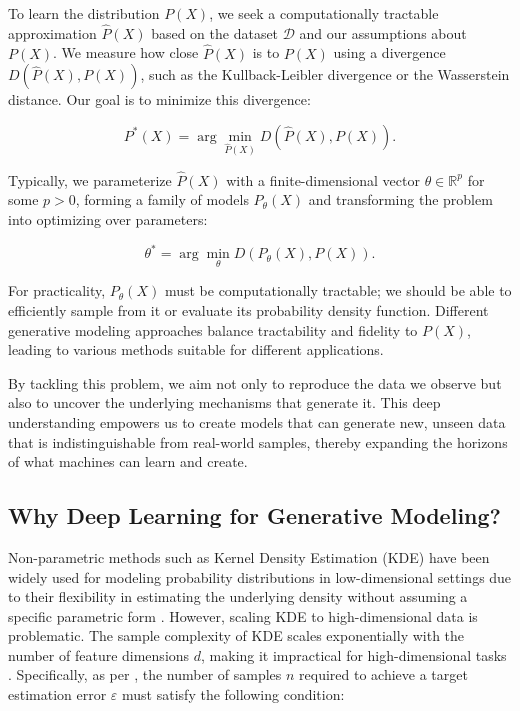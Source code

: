 To learn the distribution \( P(X) \), we seek a computationally tractable approximation \( \hat{P}(X) \) based on the dataset \( \mathcal{D} \) and our assumptions about \( P(X) \). We measure how close \( \hat{P}(X) \) is to \( P(X) \) using a divergence \( D(\hat{P}(X), P(X)) \), such as the Kullback-Leibler divergence or the Wasserstein distance. Our goal is to minimize this divergence:

\[
P^{\ast}(X) = \arg \min_{\hat{P}(X)} D(\hat{P}(X), P(X)).
\]

Typically, we parameterize \( \hat{P}(X) \) with a finite-dimensional vector \( \theta \in \mathbb{R}^p \) for some $p>0$, forming a family of models \( P_{\theta}(X) \) and transforming the problem into optimizing over parameters:

\[
\theta^* = \arg \min_\theta D(P_{\theta}(X), P(X)).
\]

For practicality, \( P_{\theta}(X) \) must be computationally tractable; we should be able to efficiently sample from it or evaluate its probability density function. Different generative modeling approaches balance tractability and fidelity to \( P(X) \), leading to various methods suitable for different applications.

By tackling this problem, we aim not only to reproduce the data we observe but also to uncover the underlying mechanisms that generate it. This deep understanding empowers us to create models that can generate new, unseen data that is indistinguishable from real-world samples, thereby expanding the horizons of what machines can learn and create.

\subsection{Why Deep Learning for Generative Modeling?}

Non-parametric methods such as Kernel Density Estimation (KDE) have been widely used for modeling probability distributions in low-dimensional settings due to their flexibility in estimating the underlying density without assuming a specific parametric form \cite{silverman1986density}. However, scaling KDE to high-dimensional data is problematic. The sample complexity of KDE scales exponentially with the number of feature dimensions \( d \), making it impractical for high-dimensional tasks \cite{wasserman2006all}. Specifically, as per \cite{scott2015multivariate}, the number of samples \( n \) required to achieve a target estimation error \( \varepsilon \) must satisfy the following condition:

